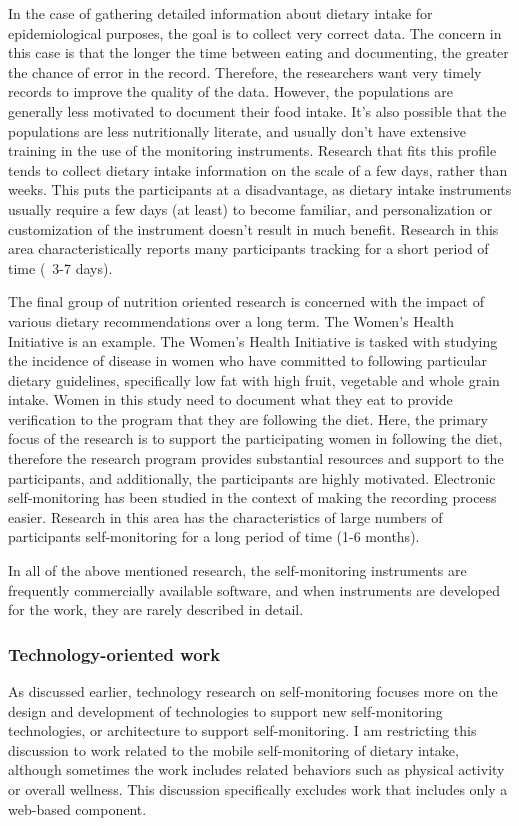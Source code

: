 In the case of gathering detailed information about dietary intake for epidemiological purposes, the goal is to collect very correct data. The concern in this case is that the longer the time between eating and documenting, the greater the chance of error in the record. Therefore, the researchers want very timely records to improve the quality of the data. However, the populations are generally less motivated to document their food intake. It's also possible that the populations are less nutritionally literate, and usually don't have extensive training in the use of the monitoring instruments. Research that fits this profile tends to collect dietary intake information on the scale of a few days, rather than weeks. This puts the participants at a disadvantage, as dietary intake instruments usually require a few days (at least) to become familiar, and personalization or customization of the instrument doesn't result in much benefit. Research in this area characteristically reports many participants tracking for a short period of time (~3-7 days).

The final group of nutrition oriented research is concerned with the impact of various dietary recommendations over a long term. The Women's Health Initiative is an example. The Women's Health Initiative is tasked with studying the incidence of disease in women who have committed to following particular dietary guidelines, specifically low fat with high fruit, vegetable and whole grain intake. Women in this study need to document what they eat to provide verification to the program that they are following the diet. Here, the primary focus of the research is to support the participating women in following the diet, therefore the research program provides substantial resources and support to the participants, and additionally, the participants are highly motivated. Electronic self-monitoring has been studied in the context of making the recording process easier. Research in this area has the characteristics of large numbers of participants self-monitoring for a long period of time (1-6 months). 

In all of the above mentioned research, the self-monitoring instruments are frequently commercially available software, and when instruments are developed for the work, they are rarely described in detail. 

\subsubsection{Technology-oriented work}
As discussed earlier, technology research on self-monitoring focuses more on the design and development of technologies to support new self-monitoring technologies, or architecture to support self-monitoring. I am restricting this discussion to  work related to the mobile self-monitoring of dietary intake, although sometimes the work includes related behaviors such as physical activity or overall wellness. This discussion specifically excludes work that includes only a web-based component. 

